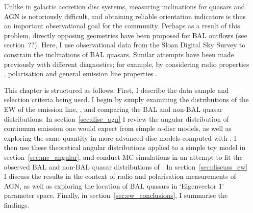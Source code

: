 Unlike in galactic accretion disc systems, measuring inclinations
for quasars and AGN is notoriously difficult, and obtaining 
reliable orientation indicators is thus an important observational
goal for the community. Perhaps as a result of this problem, 
directly opposing geometries have been proposed for 
BAL outflows (see section~??). Here, I use observational 
data from the Sloan Digital Sky Survey to constrain the inclinations
of BAL quasars. Similar attempts have been made previously with
different diagnostics; for example, by considering 
radio properties \citep{zhou2006,dipompeo2012a}, 
polarisation \citep{brotherton2006}
and general emission line properties \citep{dipompeo2012b}.  

This chapter is structured as follows. First, I describe
the data sample and selection criteria being used. I begin by
simply examining the distributions of the EW of the \oiiifull emission line,
\ewo, and comparing the BAL and non-BAL quasar distributions. 
In section~\ref{sec:disc_agn} I review the angular distribution of 
continuum emission one would expect from simple $\alpha$-disc models, 
as well as exploring the same quantity in more advanced disc models computed
with \agn. I then use these theoretical 
angular distributions applied to a simple toy model in 
section~\ref{sec:mc_angular},
and conduct MC simulations in an attempt to fit the observed BAL and non-BAL
quasar distributions of \ewo. 
In section~\ref{sec:discuss_ew} I discuss the results
in the context of radio and polarisation measurements of AGN, as well
as exploring the location of BAL quasars in `Eigenvector 1' parameter space.
Finally, in section~\ref{sec:ew_conclusions}, I summarise the findings.


